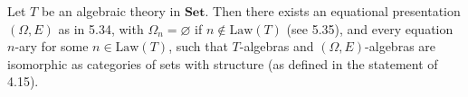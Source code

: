 Let $T$ be an algebraic theory in $\mathbf{Set}$. Then there exists an equational presentation $(\Omega, E)$ as in 5.34, with $\Omega_n = \varnothing$ if $n \notin \mathrm{Law}(T)$ (see 5.35), and every equation $n$-ary for some $n \in \mathrm{Law}(T)$, such that $T$-algebras and $(\Omega, E)$-algebras are isomorphic as categories of sets with structure (as defined in the statement of 4.15).
